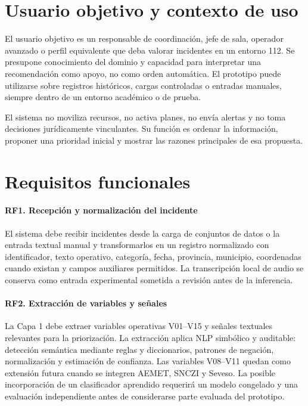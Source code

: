 \section{Usuario objetivo y contexto de uso}

El usuario objetivo es un responsable de coordinación, jefe de sala, operador avanzado o perfil equivalente que deba valorar incidentes en un entorno 112. Se presupone conocimiento del dominio y capacidad para interpretar una recomendación como apoyo, no como orden automática. El prototipo puede utilizarse sobre registros históricos, cargas controladas o entradas manuales, siempre dentro de un entorno académico o de prueba.

El sistema no moviliza recursos, no activa planes, no envía alertas y no toma decisiones jurídicamente vinculantes. Su función es ordenar la información, proponer una prioridad inicial y mostrar las razones principales de esa propuesta.

\section{Requisitos funcionales}

\paragraph{RF1. Recepción y normalización del incidente}
El sistema debe recibir incidentes desde la carga de conjuntos de datos o la entrada textual manual y transformarlos en un registro normalizado con identificador, texto operativo, categoría, fecha, provincia, municipio, coordenadas cuando existan y campos auxiliares permitidos. La transcripción local de audio se conserva como entrada experimental sometida a revisión antes de la inferencia.

\paragraph{RF2. Extracción de variables y señales}
La Capa 1 debe extraer variables operativas V01--V15 y señales textuales relevantes para la priorización. La extracción aplica NLP simbólico y auditable: detección semántica mediante reglas y diccionarios, patrones de negación, normalización y estimación de confianza. Las variables V08--V11 quedan como extensión futura cuando se integren AEMET, SNCZI y Seveso. La posible incorporación de un clasificador aprendido requerirá un modelo congelado y una evaluación independiente antes de considerarse parte evaluada del prototipo.

